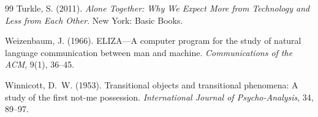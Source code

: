 \documentclass[11pt]{article}
\begin{document}
\begin{thebibliography}{99}
Turkle, S. (2011).
\newblock \emph{Alone Together: Why We Expect More from Technology and Less
  from Each Other}.
\newblock New York: Basic Books.

Weizenbaum, J. (1966).
\newblock ELIZA---A computer program for the study of natural language
  communication between man and machine.
\newblock \emph{Communications of the ACM}, 9(1), 36--45.

Winnicott, D.~W. (1953).
\newblock Transitional objects and transitional phenomena: A study of the
  first not-me possession.
\newblock \emph{International Journal of Psycho-Analysis}, 34, 89--97.

\end{thebibliography}
\end{document}
